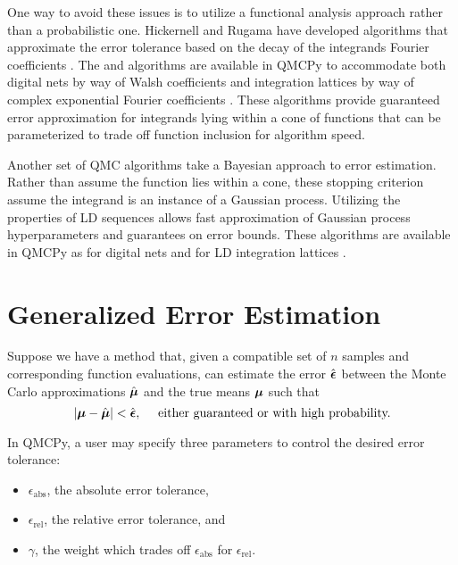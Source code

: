 \documentclass{article}
\begin{document}
One way to avoid these issues is to utilize a functional analysis approach rather than a probabilistic one. Hickernell and Rugama have developed algorithms that approximate the error tolerance based on the decay of the integrands Fourier coefficients \cite{adaptive_qmc}. The  and  algorithms are available in QMCPy to accommodate both digital nets by way of Walsh coefficients \cite{cubqmcsobol} and integration lattices by way of complex exponential Fourier coefficients \cite{cubqmclattice}. These algorithms provide guaranteed error approximation for integrands lying within a cone of functions that can be parameterized to trade off function inclusion for algorithm speed. 

Another set of QMC algorithms take a Bayesian approach to error estimation. Rather than assume the function lies within a cone, these stopping criterion assume the integrand is an instance of a Gaussian process. Utilizing the properties of LD sequences allows fast approximation of Gaussian process hyperparameters and guarantees on error bounds. These algorithms are available in QMCPy as  for digital nets  and  for LD integration lattices \cite{cubqmcbayeslattice}. 

\section{Generalized Error Estimation} \label{sec: Generalized Error Estimation}

Suppose we have a method that, given a compatible set of $n$ samples and corresponding function evaluations, can estimate the error $\hat{\boldsymbol{\epsilon}}$ between the Monte Carlo approximations $\hat{\boldsymbol{\mu}}$ and the true means $\boldsymbol{\mu}$ such that 
\begin{equation}
    \lvert \boldsymbol{\mu} - \hat{\boldsymbol{\mu}} \rvert< \hat{\boldsymbol{\epsilon}}, \quad \text{ either guaranteed or with high probability.}
\end{equation}




In QMCPy, a user may specify three parameters to control the desired error tolerance: 
\begin{itemize}
    \item $\epsilon_{\text{abs}}$, the absolute error tolerance,
    \item $\epsilon_{\text{rel}}$, the relative error tolerance, and 
    \item $\gamma$, the weight which trades off $\epsilon_{\text{abs}}$ for $\epsilon_{\text{rel}}$.
\end{itemize}
\end{document}
